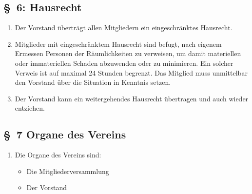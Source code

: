 \documentclass[10pt,a4paper]{scrartcl}
\begin{document}
\subsection*{\S \ 6: Hausrecht}
\begin{enumerate}
	\item Der Vorstand übertr{\"a}gt allen Mitgliedern ein
		eingeschr{\"a}nktes Hausrecht.
	\item Mitglieder mit eingeschr{\"a}nktem Hausrecht sind
		befugt, nach eigenem Ermessen Personen der
		R{\"a}umlichkeiten zu verweisen, um damit materiellen
		oder immateriellen Schaden abzuwenden oder zu
		minimieren. Ein solcher Verweis ist auf maximal 24
		Stunden begrenzt. Das Mitglied muss unmittelbar
		den Vorstand {\"u}ber die Situation in Kenntnis setzen.
	\item Der Vorstand kann ein weitergehendes Hausrecht
		{\"u}bertragen und auch wieder entziehen.
\end{enumerate}
%
%
\subsection*{\S \ 7 Organe des Vereins }
\begin{enumerate}
	\item Die Organe des Vereins sind:
		\begin{itemize}
			\item Die Mitgliederversammlung
			\item Der Vorstand
		\end{itemize}
\end{enumerate}
%
%
\end{document}
